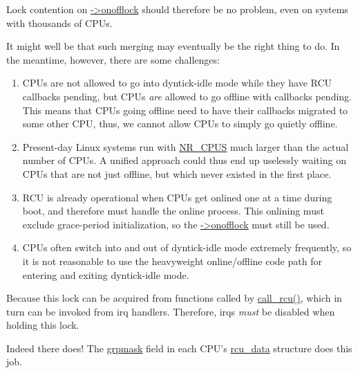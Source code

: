 Lock contention on \url{->onofflock} should therefore
be no problem, even on systems with thousands of CPUs.


It might well be that such merging may eventually be the right thing to
do.
In the meantime, however, there are some challenges:

\begin{enumerate}
\item	CPUs are not allowed to go into dyntick-idle mode while they
	have RCU callbacks pending, but CPUs \emph{are} allowed to go
	offline with callbacks pending.
	This means that CPUs going offline need to have their callbacks
	migrated to some other CPU, thus, we cannot allow CPUs to simply
	go quietly offline.
\item	Present-day Linux systems run with \url{NR_CPUS}
	much larger than the actual number of CPUs.
	A unified approach could thus end up uselessly waiting on
	CPUs that are not just offline, but which never existed in
	the first place.
\item	RCU is already operational when CPUs get onlined one
	at a time during boot, and therefore must handle the online
	process.
	This onlining must exclude grace-period initialization, so
	the \url{->onofflock} must still be used.
\item	CPUs often switch into and out of dyntick-idle mode
	extremely frequently, so it is not reasonable to use the
	heavyweight online/offline code path for entering and exiting
	dyntick-idle mode.
\end{enumerate}


	Because this lock can be acquired from functions
	called by \url{call_rcu()}, which in turn can be
	invoked from irq handlers.
	Therefore, irqs \emph{must} be disabled when
	holding this lock.


	Indeed there does!
	The \url{grpmask} field in each CPU's \url{rcu_data}
	structure does this job.

